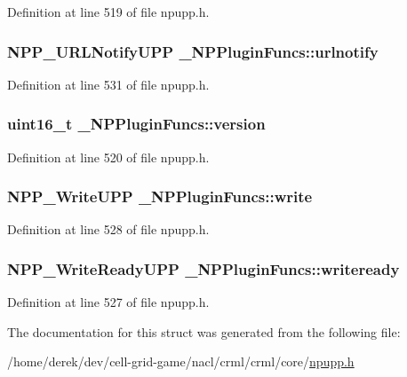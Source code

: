 Definition at line 519 of file npupp.h.

\hypertarget{struct___n_p_plugin_funcs_abcc20eb63b3b3cb631bbb107bc91fa8e}{
\subsubsection[{urlnotify}]{\setlength{\rightskip}{0pt plus 5cm}NPP\_\-URLNotifyUPP {\bf \_\-NPPluginFuncs::urlnotify}}}
\label{struct___n_p_plugin_funcs_abcc20eb63b3b3cb631bbb107bc91fa8e}


Definition at line 531 of file npupp.h.

\hypertarget{struct___n_p_plugin_funcs_a86672b8f4c5e096d3858729fe12b97ae}{
\subsubsection[{version}]{\setlength{\rightskip}{0pt plus 5cm}uint16\_\-t {\bf \_\-NPPluginFuncs::version}}}
\label{struct___n_p_plugin_funcs_a86672b8f4c5e096d3858729fe12b97ae}


Definition at line 520 of file npupp.h.

\hypertarget{struct___n_p_plugin_funcs_a0e4c5a8fc923e8bf77c7a6b957349dd3}{
\subsubsection[{write}]{\setlength{\rightskip}{0pt plus 5cm}NPP\_\-WriteUPP {\bf \_\-NPPluginFuncs::write}}}
\label{struct___n_p_plugin_funcs_a0e4c5a8fc923e8bf77c7a6b957349dd3}


Definition at line 528 of file npupp.h.

\hypertarget{struct___n_p_plugin_funcs_a34bbf1ebb2413c678eb003bb3781e005}{
\subsubsection[{writeready}]{\setlength{\rightskip}{0pt plus 5cm}NPP\_\-WriteReadyUPP {\bf \_\-NPPluginFuncs::writeready}}}
\label{struct___n_p_plugin_funcs_a34bbf1ebb2413c678eb003bb3781e005}


Definition at line 527 of file npupp.h.



The documentation for this struct was generated from the following file:\begin{DoxyCompactItemize}
\item 
/home/derek/dev/cell-\/grid-\/game/nacl/crml/crml/core/\hyperlink{npupp_8h}{npupp.h}\end{DoxyCompactItemize}
